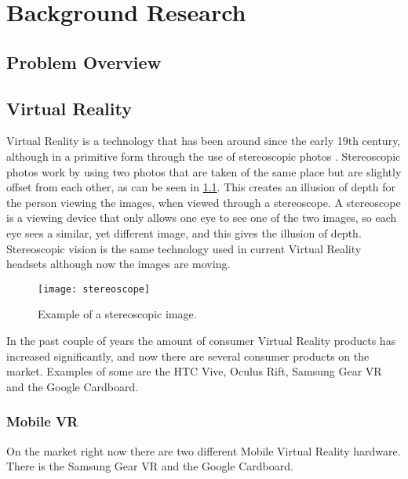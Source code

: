 \chapter{Background Research}
\label{chapter2}

\section{Problem Overview}
\lipsum[1-1] \cite{parikh1980adaptive}

\section{Virtual Reality}
	Virtual Reality is a technology that has been around since the early 19th century, although in a primitive form through the use of stereoscopic photos \cite{stereoscopy}. Stereoscopic photos work by using two photos that are taken of the same place but are slightly offset from each other, as can be seen in \ref{fig:stereoscope1}. This creates an illusion of depth for the person viewing the images, when viewed through a stereoscope. A stereoscope is a viewing device that only allows one eye to see one of the two images, so each eye sees a similar, yet different image, and this gives the illusion of depth. Stereoscopic vision is the same technology used in current Virtual Reality headsets although now the images are moving.\\


\begin{figure}[H]
	\texttt{[image: stereoscope]}
	\centering
	\caption{Example of a stereoscopic image.}
	\label{fig:stereoscope1}
\end{figure}

	In the past couple of years the amount of consumer Virtual Reality products has increased significantly, and now there are several consumer products on the market. Examples of some are the HTC Vive, Oculus Rift, Samsung Gear VR and the Google Cardboard.

\subsection{Mobile VR}
On the market right now there are two different Mobile Virtual Reality hardware. There is the Samsung Gear VR and the Google Cardboard.

